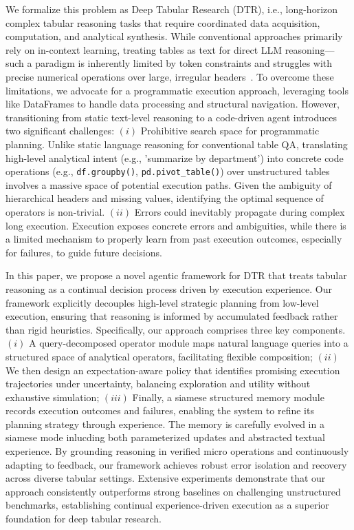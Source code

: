 \documentclass{article}
\theoremstyle{plain}
\theoremstyle{definition}
\theoremstyle{remark}
\begin{document}
We formalize this problem as Deep Tabular Research (DTR), i.e., long-horizon complex tabular reasoning tasks that require coordinated data acquisition, computation, and analytical synthesis. While conventional approaches primarily rely on in-context learning, treating tables as text for direct LLM reasoning—such a paradigm is inherently limited by token constraints and struggles with precise numerical operations over large, irregular headers~\cite{sarkar2023testing,singha2023tabular}. To overcome these limitations, we advocate for a programmatic execution approach, leveraging tools like DataFrames to handle data processing and structural navigation. However, transitioning from static text-level reasoning to a code-driven agent introduces two significant challenges: \((i)\) Prohibitive search space for programmatic planning. Unlike static language reasoning for conventional table QA, translating high-level analytical intent (e.g., 'summarize by department') into concrete code operations (e.g., \texttt{df.groupby()}, \texttt{pd.pivot\_table()}) over unstructured tables involves a massive space of potential execution paths. Given the ambiguity of hierarchical headers and missing values, identifying the optimal sequence of operators is non-trivial. \((ii)\) Errors could inevitably propagate during complex long execution. Execution exposes concrete errors and ambiguities, while there is a limited mechanism to properly learn from past execution
outcomes, especially for failures, to guide future decisions. 

In this paper, we propose a novel agentic framework for DTR that treats tabular reasoning as a continual decision process driven by execution experience. Our framework explicitly decouples high-level strategic planning from low-level execution, ensuring that reasoning is informed by accumulated feedback rather than rigid heuristics. Specifically, our approach comprises three key components. \((i)\) A query-decomposed operator module maps natural language queries into a structured space of analytical operators, facilitating flexible composition; \((ii)\) We then design an expectation-aware policy that identifies promising execution trajectories under uncertainty, balancing exploration and utility without exhaustive simulation; \((iii)\) Finally, a siamese structured memory module records execution outcomes and failures, enabling the system to refine its planning strategy through experience. The memory is carefully evolved in a siamese mode inlucding both parameterized updates and abstracted textual experience. By grounding reasoning in verified micro operations and continuously adapting to feedback, our framework achieves robust error isolation and recovery across diverse tabular settings. Extensive experiments demonstrate that our approach consistently outperforms strong baselines on challenging unstructured benchmarks, establishing continual experience-driven execution as a superior foundation for deep tabular research.
\end{document}
